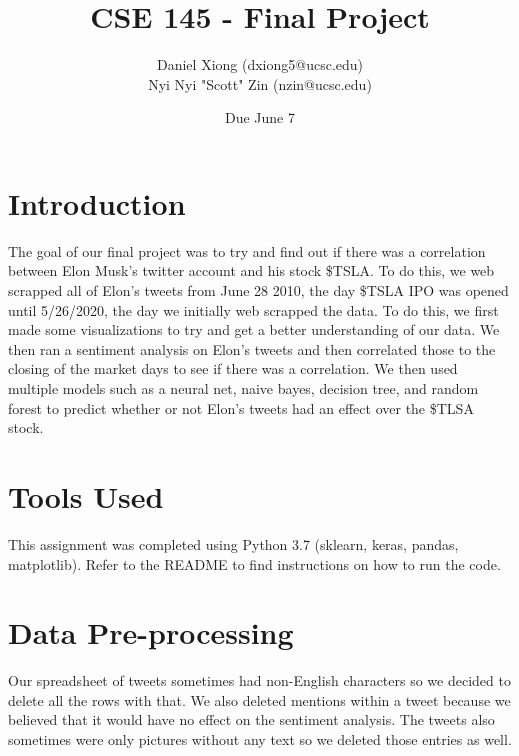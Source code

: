 \documentclass[12pt, notitlepage]{article}
\title{CSE 145 - Final Project}
\author{Daniel Xiong (dxiong5@ucsc.edu)\\
		Nyi Nyi "Scott" Zin (nzin@ucsc.edu)}
\date{Due June 7}
\begin{document}
\maketitle
\section{Introduction}
The goal of our final project was to try and find out if there was a correlation between Elon Musk's twitter account and his stock \$TSLA. To do this, we web scrapped all of Elon's tweets from June 28 2010, the day \$TSLA IPO was opened until 5/26/2020, the day we initially web scrapped the data. To do this, we first made some visualizations to try and get a better understanding of our data. We then ran a sentiment analysis on Elon's tweets and then correlated those to the closing of the market days to see if there was a correlation. We then used multiple models such as a neural net, naive bayes, decision tree, and random forest to predict whether or not Elon's tweets had an effect over the \$TLSA stock.
\section{Tools Used}
This assignment was completed using Python 3.7 (sklearn, keras, pandas, matplotlib). Refer to the
README to find instructions on how to run the code.
\section{Data Pre-processing}
Our spreadsheet of tweets sometimes had non-English characters so we decided to delete all the rows with that. We also deleted mentions within a tweet because we believed that it would have no effect on the sentiment analysis. The tweets also sometimes were only pictures without any text so we deleted those entries as well. 
\end{document}
